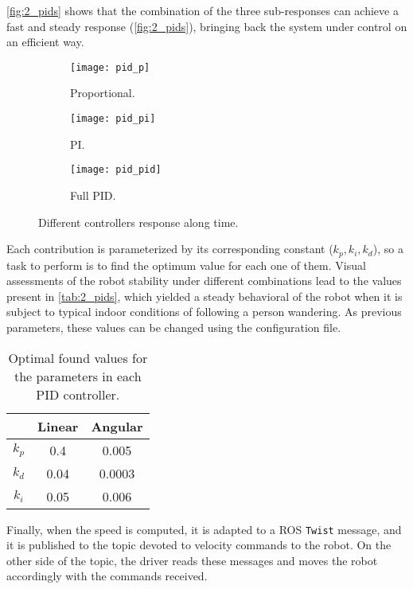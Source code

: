 \autoref{fig:2_pids} shows that the combination of the three sub-responses can achieve a fast and steady response (\autoref{fig:2_pids}), bringing back the system under control on an efficient way.

\begin{figure}[h]
	\centering
	\begin{subfigure}[b]{0.3\linewidth}
		\centering
		\texttt{[image: pid\_p]}
		\caption{Proportional.}
		\label{fig:2_pid_p}
	\end{subfigure}
	\hfill
	\begin{subfigure}[b]{0.3\linewidth}
		\centering
		\texttt{[image: pid\_pi]}
		\caption{PI.}
		\label{fig:2_pid_pi}
	\end{subfigure}
	\hfill
	\begin{subfigure}[b]{0.3\linewidth}
		\centering
		\texttt{[image: pid\_pid]}
		\caption{Full PID.}
		\label{fig:2_pid_pid}
	\end{subfigure}
	\caption{Different controllers response along time.}
	\label{fig:2_pids}		 	
\end{figure}

Each contribution is parameterized by its corresponding constant ($k_p, k_i, k_d$), so a task to perform is to find the optimum value for each one of them. Visual assessments of the robot stability under different combinations lead to the values present in \autoref{tab:2_pids}, which yielded a steady behavioral of the robot when it is subject to typical indoor conditions of following a person wandering. As previous parameters, these values can be changed using the configuration file.

\begin{table}[h]
	\centering
	\begin{tabular}{|c|c|c|}
		\hline
		\textbf{} & \textbf{Linear} & \textbf{Angular} \\ \hline
		$k_p$     & 0.4               & 0.005               \\ \hline
		$k_d$     & 0.04              & 0.0003              \\ \hline
		$k_i$     & 0.05              & 0.006               \\ \hline
	\end{tabular}
	\caption{Optimal found values for the parameters in each PID controller.}
	\label{tab:2_pids}
\end{table}

Finally, when the speed is computed, it is adapted to a ROS \texttt{Twist} message, and it is published to the topic devoted to velocity commands to the robot. On the other side of the topic, the driver reads these messages and moves the robot accordingly with the commands received.\\

